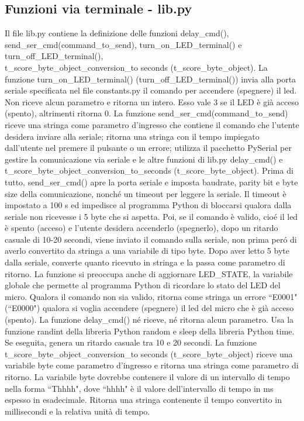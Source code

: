\documentclass[a4paper]{article}
\begin{document}
\subsection{Funzioni via terminale - lib.py}
Il file lib.py contiene la definizione delle funzioni delay\_cmd(), send\_ser\_cmd(command\_to\_send),  turn\_on\_LED\_terminal() e turn\_off\_LED\_terminal(), \\ t\_score\_byte\_object\_conversion\_to seconds (t\_score\_byte\_object).
\newline
La funzione turn\_on\_LED\_terminal() (turn\_off\_LED\_terminal()) invia alla porta seriale specificata nel file constants.py il comando per accendere (spegnere) il led. Non riceve alcun parametro e ritorna un intero. Esso vale 3 se il LED \`{e} gi\`{a} acceso (spento), altrimenti ritorna 0.
\newline
La funzione send\_ser\_cmd(command\_to\_send) riceve una stringa come parametro d'ingresso che contiene il comando che l'utente desidera inviare alla seriale; ritorna una stringa con il tempo impiegato dall'utente nel premere il pulsante o un errore; utilizza il pacchetto PySerial per gestire la comunicazione via seriale e le altre funzioni di lib.py delay\_cmd() e t\_score\_byte\_object\_conversion\_to\_seconds (t\_score\_byte\_object).
\newline
Prima di tutto, send\_ser\_cmd() apre la porta seriale e imposta baudrate, parity bit e byte size della comunicazione, nonch\'{e} un timeout per leggere la seriale. Il timeout \`{e} impostato a 100 s ed impedisce al programma Python di bloccarsi qualora dalla seriale non ricevesse i 5 byte che si aspetta. Poi, se il comando \`{e} valido, cio\'{e} il led è spento (acceso) e l'utente desidera accenderlo (spegnerlo), dopo un ritardo casuale di 10-20 secondi, viene inviato il comando sulla seriale, non prima per\'{o} di averlo convertito da stringa a una variabile di tipo byte. Dopo aver letto 5 byte dalla seriale, converte quanto ricevuto in stringa e la passa come parametro di ritorno. La funzione si preoccupa anche di aggiornare LED\_STATE, la variabile globale che permette al programma Python di ricordare lo stato del LED del micro. Qualora il comando non sia valido, ritorna come stringa un errore ``E0001" (``E0000") qualora si voglia accendere (spegnere) il led del micro che \`{e} gi\`{a} acceso (spento).
La funzione delay\_cmd() n\'{e} riceve, n\'{e} ritorna alcun parametro. Usa la funzione randint della libreria Python random e sleep della libreria Python time. Se eseguita, genera un ritardo casuale tra 10 e 20 secondi.
La funzione  t\_score\_byte\_object\_conversion\_to seconds (t\_score\_byte\_object) riceve una variabile byte come parametro d'ingresso e ritorna una stringa come parametro di ritorno. La variabile byte dovrebbe contenere il valore di un intervallo di tempo nella forma ``Thhhh", dove ``hhhh" è il valore dell'intervallo di tempo in ms espesso in esadecimale. Ritorna una stringa contenente il tempo convertito in millisecondi e la relativa unità di tempo. 
\end{document}
